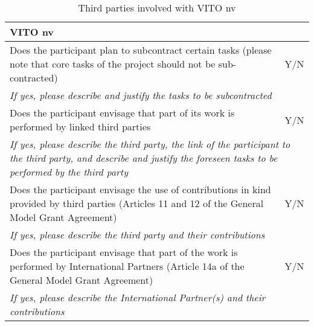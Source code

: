 \begin{table}[H]
	\centering
	\begin{tabular}{|p{10cm}|p{4cm}|}
		\hline
		
		\multicolumn{2}{|p{14cm}|}{\textbf{VITO nv}}\\
		
		\hline
		
		Does the participant plan to subcontract certain tasks (please note that core tasks of the project should not be sub-contracted) & Y/N\\
		
		\hline
		
		\multicolumn{2}{|p{14cm}|}{\textit{If yes, please describe and justify the tasks to be subcontracted}}\\
		
		\hline
		
		Does the participant envisage that part of its work is performed by linked third parties & Y/N\\
		
		\hline
		
		\multicolumn{2}{|p{14cm}|}{\textit{If yes, please describe the third party, the link of the participant to the third party, and describe and justify the foreseen tasks to be performed by the third party}}\\
		
		\hline
		
		Does the participant envisage the use of contributions in kind provided by third parties (Articles 11 and 12 of the General Model Grant Agreement) & Y/N\\
		
		\hline
		
		\multicolumn{2}{|p{14cm}|}{\textit{If yes, please describe the third party and their contributions}}\\
		
		\hline
		
		Does the participant envisage that part of the work is performed by International Partners (Article 14a of the General Model Grant Agreement) & Y/N\\
		
		\hline
		
		\multicolumn{2}{|p{14cm}|}{\textit{If yes, please describe the International Partner(s) and their contributions}}\\
		
		\hline
	\end{tabular}
	\caption{Third parties involved with VITO nv}
\end{table}